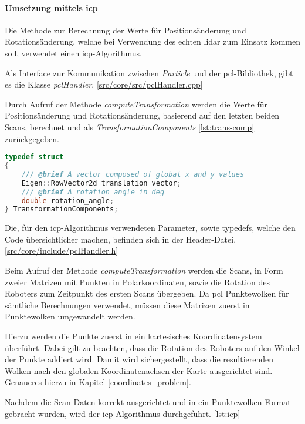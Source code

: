 \paragraph{Umsetzung mittels \ac{icp}} \mbox{}
Die Methode zur Berechnung der Werte für Positionsänderung und Rotationsänderung,
welche bei Verwendung des echten \ac{lidar} zum Einsatz kommen soll, verwendet einen \ac{icp}-Algorithmus.

Als Interface zur Kommunikation zwischen \textit{Particle} und der \ac{pcl}-Bibliothek, gibt es die Klasse \textit{pclHandler}.
[\href{https://github.com/Jundy0/Studienarbeit/blob/main/src/core/src/pclHandler.cpp}{src/core/src/pclHandler.cpp}]

Durch Aufruf der Methode \textit{computeTransformation} werden die Werte für Positionsänderung und Rotationsänderung, 
basierend auf den letzten beiden Scans, berechnet und als \textit{TransformationComponents} \ref{lst:trans-comp} zurückgegeben.

\begin{lstlisting}[caption={Aufbau \textit{TransformationComponents}},label={lst:trans-comp},language={C++}]
typedef struct
{
    /// @brief A vector composed of global x and y values
    Eigen::RowVector2d translation_vector;
    /// @brief A rotation angle in deg
    double rotation_angle;
} TransformationComponents;
\end{lstlisting}

Die, für den \ac{icp}-Algorithmus verwendeten Parameter, sowie typedefs, welche den Code übersichtlicher machen, befinden sich in der Header-Datei.
[\href{https://github.com/Jundy0/Studienarbeit/blob/main/src/core/include/pclHandler.h}{src/core/include/pclHandler.h}]

Beim Aufruf der Methode \textit{computeTransformation} werden die Scans, in Form zweier Matrizen mit Punkten in Polarkoordinaten, 
sowie die Rotation des Roboters zum Zeitpunkt des ersten Scans übergeben.
Da \ac{pcl} Punktewolken für sämtliche Berechnungen verwendet, müssen diese Matrizen zuerst in Punktewolken umgewandelt werden.

Hierzu werden die Punkte zuerst in ein kartesisches Koordinatensystem überführt.
Dabei gilt zu beachten, dass die Rotation des Roboters auf den Winkel der Punkte addiert wird.
Damit wird sichergestellt, dass die resultierenden Wolken nach den globalen Koordinatenachsen der Karte ausgerichtet sind.
Genaueres hierzu in Kapitel \ref{coordinates_problem}.

Nachdem die Scan-Daten korrekt ausgerichtet und in ein Punktewolken-Format gebracht wurden, wird der \ac{icp}-Algorithmus durchgeführt. \ref{lst:icp}

